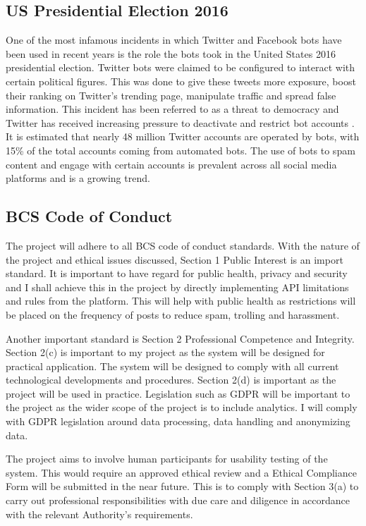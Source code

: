 \documentclass[chapterprefix=false]{scrreprt}
\begin{document}
\subsection{US Presidential Election 2016}

One of the most infamous incidents in which Twitter and Facebook bots have been used in recent years is the role the bots took in the United States 2016 presidential election\cite{us-election}. Twitter bots were claimed to be configured to interact with certain political figures. This was done to give these tweets more exposure, boost their ranking on Twitter's trending page, manipulate traffic and spread false information. This incident has been referred to as a threat to democracy and Twitter has received increasing pressure to deactivate and restrict bot accounts \cite{gorbis_woolley_2019}. It is estimated that nearly 48 million Twitter accounts are operated by bots, with 15\% of the total accounts coming from automated bots\cite{varol2017online}. The use of bots to spam content and engage with certain accounts is prevalent across all social media platforms and is a growing trend.

\subsection{BCS Code of Conduct}

The project will adhere to all BCS code of conduct standards. With the nature of the project and ethical issues discussed, Section 1 Public Interest is an import standard. It is important to have regard for public health, privacy and security and I shall achieve this in the project by directly implementing API limitations and rules from the platform. This will help with public health as restrictions will be placed on the frequency of posts to reduce spam, trolling and harassment.

Another important standard is Section 2 Professional Competence and Integrity. Section 2(c) is important to my project as the system will be designed for practical application. The system will be designed to comply with all current technological developments and procedures. Section 2(d) is important as the project will be used in practice. Legislation such as GDPR will be important to the project as the wider scope of the project is to include analytics. I will comply with GDPR legislation around data processing, data handling and anonymizing data.

The project aims to involve human participants for usability testing of the system. This would require an approved ethical review and a Ethical Compliance Form will be submitted in the near future. This is to comply with Section 3(a) to carry out professional responsibilities with due care and diligence in accordance with the relevant Authority’s requirements. 
\end{document}
